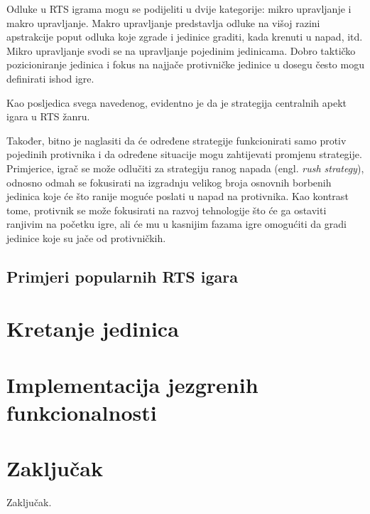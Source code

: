 \documentclass[times, utf8, zavrsni, numeric]{fer}
\begin{document}
\par Odluke u RTS igrama mogu se podijeliti u dvije kategorije: mikro upravljanje i makro upravljanje. 
Makro upravljanje predstavlja odluke na višoj razini apstrakcije poput odluka koje zgrade i jedinice graditi, kada krenuti u napad, itd. 
Mikro upravljanje svodi se na upravljanje pojedinim jedinicama.
Dobro taktičko pozicioniranje jedinica i fokus na najjače protivničke jedinice u dosegu često mogu definirati ishod igre.\cite{article:HybridPathdinding}

\par Kao posljedica svega navedenog, evidentno je da je strategija centralnih apekt igara u RTS žanru. 

\par Također, bitno je naglasiti da će određene strategije funkcionirati samo protiv pojedinih protivnika i da određene situacije mogu zahtijevati promjenu strategije. 
Primjerice, igrač se može odlučiti za strategiju ranog napada (engl. \textit{rush strategy}), odnosno odmah se fokusirati na izgradnju velikog broja osnovnih borbenih jedinica koje će što ranije moguće poslati u napad na protivnika.
Kao kontrast tome, protivnik se može fokusirati na razvoj tehnologije što će ga ostaviti ranjivim na početku igre, ali će mu u kasnijim fazama igre omogućiti da gradi jedinice koje su jače od protivničkih.

\section{Primjeri popularnih RTS igara}

\chapter{Kretanje jedinica}\label{ch:pathfinding}

\chapter{Implementacija jezgrenih funkcionalnosti}\label{ch:implementation}

\chapter{Zaključak}\label{ch:conclusion}
Zaključak.



\end{document}
